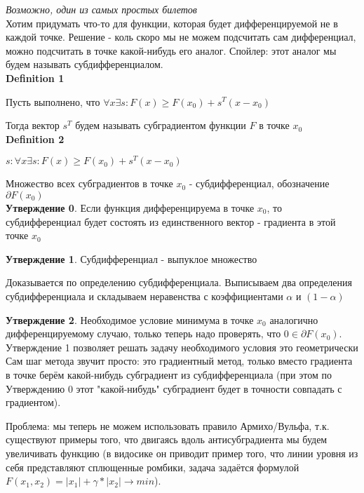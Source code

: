 \textit{Возможно, один из самых простых билетов} \\

Хотим придумать что-то для функции, которая будет дифференцируемой не в каждой точке. Решение - коль скоро мы не можем подсчитать сам дифференциал, можно подсчитать в точке какой-нибудь его аналог. Спойлер: этот аналог мы будем называть субдифференциалом. \\

\textbf{Definition 1}

Пусть выполнено, что $\forall x \exists s: F(x) \geq F(x_0) + s^T (x - x_0)$

Тогда вектор $s^T$ будем называть субградиентом функции $F$ в точке $x_0$ \\

\textbf{Definition 2}

${s: \forall x \exists s: F(x) \geq F(x_0) + s^T (x - x_0)}$

Множество всех субградиентов в точке $x_0$ - субдифференциал, обозначение $\partial F(x_0)$ \\

\textbf{Утверждение 0}. Если функция дифференцируема в точке $x_0$, то субдифференциал будет состоять из единственного вектор - градиента в этой точке $x_0$

\textbf{Утверждение 1}. Субдифференциал - выпуклое множество

Доказывается по определению субдифференциала. Выписываем два определения субдифференциала и складываем неравенства с коэффициентами $\alpha$ и $(1-\alpha)$

\textbf{Утверждение 2}. Необходимое условие минимума в точке $x_0$ аналогично дифференцируемому случаю, только теперь надо проверять, что $0 \in \partial F(x_0)$. Утверждение 1 позволяет решать задачу необходимого условия это геометрически \\

Сам шаг метода звучит просто: это градиентный метод, только вместо градиента в точке берём какой-нибудь субградиент из субдифференциала (при этом по Утверждению 0 этот "какой-нибудь" субградиент будет в точности совпадать с градиентом).

Проблема: мы теперь не можем использовать правило Армихо/Вульфа, т.к. существуют примеры того, что двигаясь вдоль антисубградиента мы будем увеличивать функцию (в видосике он приводит пример того, что линии уровня из себя представляют сплющенные ромбики, задача задаётся формулой $F(x_1, x_2) = |x_1| + \gamma * |x_2| \to min$).


